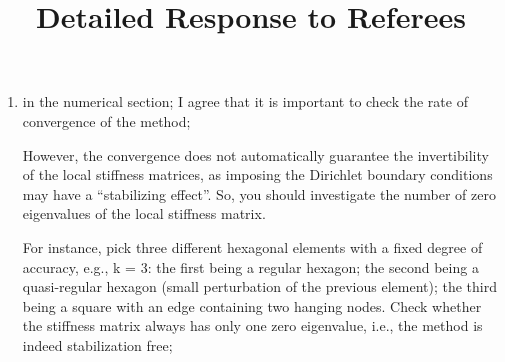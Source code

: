 \documentclass[10pt]{amsart}
\theoremstyle{definition}
\theoremstyle{remark}
\begin{document}
\title{\large Detailed Response to Referees}%

\date{}%

\maketitle

\begin{enumerate}[1.]

\item \textsf{
in the numerical section; I agree that it is important to check the rate of
convergence of the method;}

\textsf{However, the convergence does not automatically
guarantee the invertibility of the local stiffness matrices, as imposing the
Dirichlet boundary conditions may have a “stabilizing effect”. So, you should
investigate the number of zero eigenvalues of the local stiffness matrix.}

\textsf{For instance, pick three different hexagonal elements with a fixed degree of
accuracy, e.g., k = 3: the first being a regular hexagon; the second being a
quasi-regular hexagon (small perturbation of the previous element); the third
being a square with an edge containing two hanging nodes. Check whether the
stiffness matrix always has only one zero eigenvalue, i.e., the method is indeed
stabilization free; 
}


\end{enumerate}
\end{document}
